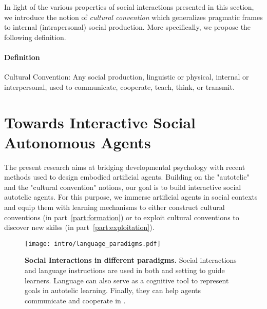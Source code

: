 In light of the various properties of social interactions presented in this section, we introduce the notion of \textit{cultural convention} which generalizes pragmatic frames to internal (intrapersonal) social production. More specifically, we propose the following definition.

\begin{tcolorbox}
\small
\paragraph{Definition}
\gls{Cultural Convention}: Any social production, linguistic or physical, internal or interpersonal, used to communicate, cooperate, teach, think, or transmit.
\end{tcolorbox}

\newpage

\section{Towards Interactive Social Autonomous Agents}

The present research aims at bridging developmental psychology with recent \ai methods used to design embodied artificial agents. Building on the "autotelic" and the "cultural convention" notions, our goal is to build interactive social autotelic agents. For this purpose, we immerse artificial agents in social contexts and equip them with learning mechanisms to either construct cultural conventions (in part~\ref{part:formation}) or to exploit cultural conventions to discover new skilss (in part~\ref{part:exploitation}). 

\begin{figure}[!h]
\centering
\texttt{[image: intro/language\_paradigms.pdf]}
\caption{\textbf{Social Interactions in different \ai paradigms.} Social interactions and language instructions are used in both \rl and \il setting to guide learners. Language can also serve as a cognitive tool to represent goals in autotelic learning. Finally, they can help agents communicate and cooperate in \marl.}
\label{fig:intro_language_paradigms}
\end{figure}

